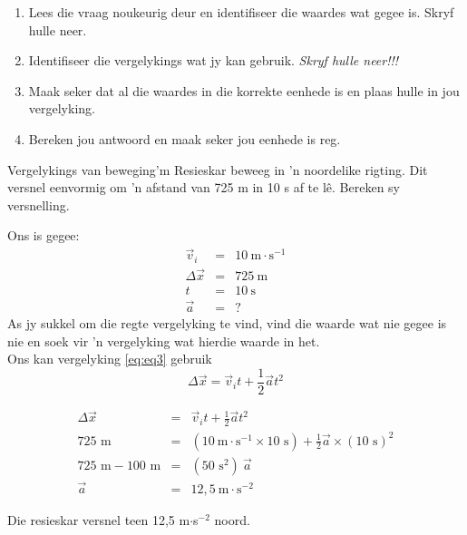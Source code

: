 \begin{enumerate}[noitemsep, label=\textbf{\arabic*}. ] 
    \item Lees die vraag noukeurig deur en identifiseer die waardes wat gegee is. Skryf hulle neer.
    \item Identifiseer die vergelykings wat jy kan gebruik. \textsl{Skryf hulle neer!!!}
    \item Maak seker dat al die waardes in die korrekte eenhede is en plaas hulle in jou vergelyking.
    \item Bereken jou antwoord en maak seker jou eenhede is reg.
\end{enumerate}

	\par
      \label{m38796*uid134}
            
\begin{wex}{Vergelykings van beweging}{'m Resieskar beweeg in  'n noordelike rigting. Dit versnel eenvormig om  'n afstand van 725 m in 10 s af te l\^e. Bereken sy versnelling.}
{
Ons is gegee:
\begin{eqnarray*}
\vec{v}_i&=&10\ \text{m} \cdot \text{s}^{-1}\\
\Delta \vec{x}&=&725\ \text{m}\\
t&=&10\ \text{s}\\
\vec{a}&=&?
\end{eqnarray*}
As jy sukkel om die regte vergelyking te vind, vind die waarde wat nie gegee is nie en soek vir  'n vergelyking wat hierdie waarde in het. \\
Ons kan vergelyking \ref{eq:eq3} gebruik
\begin{displaymath}
\Delta \vec{x}=\vec{v}_it +\frac{1}{2}\vec{a}t^2
\end{displaymath}

\begin{eqnarray*}
\Delta \vec{x} &=& \vec{v}_it +\frac{1}{2}\vec{a}t^2\\
725\text{~m} &=& (10~\text{m}\cdot \text{s}^{-1} \times 10\text{~s}) + \frac{1}{2} \vec{a} \times (10\text{~s})^2\\
725\text{~m} - 100\text{~m} &=& (50\text{~s}^2)~ \vec{a}\\
\vec{a} &=& 12,5~ \text{m} \cdot\text{s}^{-2}
\end{eqnarray*}

Die resieskar versnel teen 12,5 m$\cdot$s$^{-2}$ noord.}
\end{wex}

